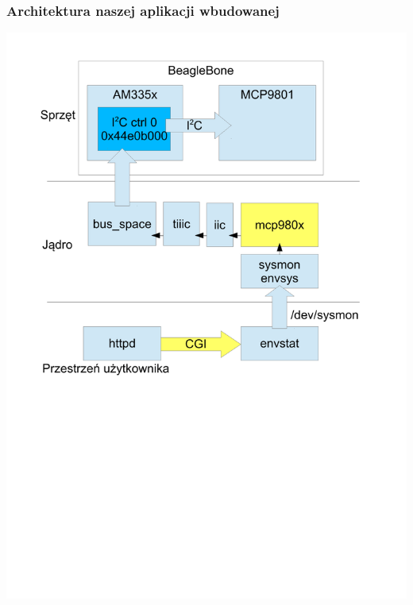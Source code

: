 \documentclass[dvipsnames,table]{beamer}
\begin{document}
\begin{frame}
\frametitle{Architektura naszej aplikacji wbudowanej}
\begin{center}
\includegraphics[scale=0.42]{img_apparch-mcp9801.pdf}
\end{center}
\end{frame}
\end{document}
